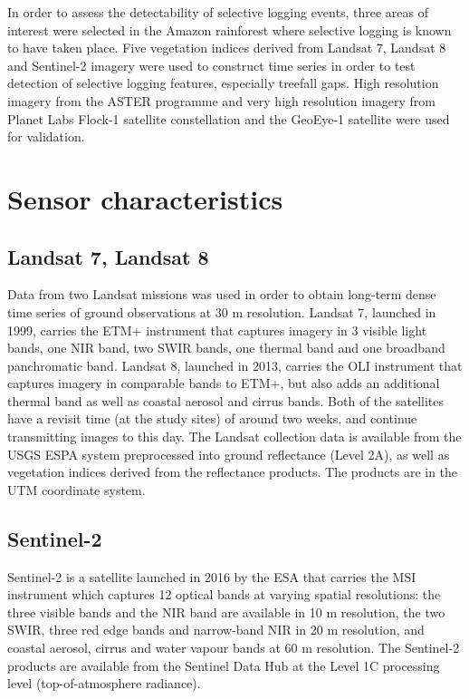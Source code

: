 \documentclass[a4paper,12pt]{scrbook}
\begin{document}
In order to assess the detectability of selective logging events, three areas of interest were selected in the Amazon rainforest where selective logging is known to have taken place. Five vegetation indices derived from Landsat 7, Landsat 8 and Sentinel-2 imagery were used to construct time series in order to test detection of selective logging features, especially treefall gaps. High resolution imagery from the ASTER programme and very high resolution imagery from Planet Labs Flock-1 satellite constellation and the GeoEye-1 satellite were used for validation.

\section{Sensor characteristics}

\subsection{Landsat 7, Landsat 8}

Data from two Landsat missions was used in order to obtain long-term dense time series of ground observations at 30 m resolution. Landsat 7, launched in 1999, carries the \ac{ETM+} instrument that captures imagery in 3 visible light bands, one \ac{NIR} band, two \ac{SWIR} bands, one thermal band and one broadband panchromatic band. Landsat 8, launched in 2013, carries the \ac{OLI} instrument that captures imagery in comparable bands to \ac{ETM+}, but also adds an additional thermal band as well as coastal aerosol and cirrus bands. Both of the satellites have a revisit time (at the study sites) of around two weeks, and continue transmitting images to this day. The Landsat collection data is available from the \ac{USGS} ESPA system preprocessed into ground reflectance (Level 2A), as well as vegetation indices derived from the reflectance products. The products are in the \ac{UTM} coordinate system.

\subsection{Sentinel-2}

Sentinel-2 is a satellite launched in 2016 by the \ac{ESA} that carries the \ac{MSI} instrument which captures 12 optical bands at varying spatial resolutions: the three visible bands and the \ac{NIR} band are available in 10 m resolution, the two \ac{SWIR}, three red edge bands and narrow-band \ac{NIR} in 20 m resolution, and coastal aerosol, cirrus and water vapour bands at 60 m resolution. The Sentinel-2 products are available from the Sentinel Data Hub at the Level 1C processing level (top-of-atmosphere radiance).
\end{document}
